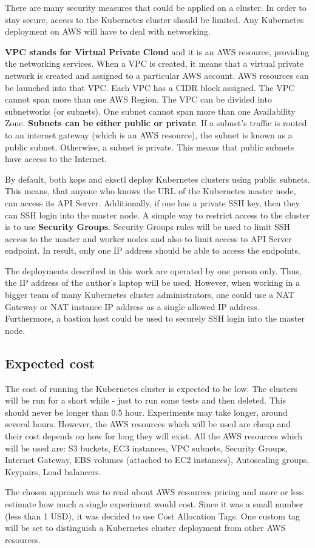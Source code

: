 There are many security measures that could be applied on a cluster. In order to stay secure, access to the Kubernetes cluster should be limited. Any Kubernetes deployment on AWS will have to deal with networking.

\textbf{VPC stands for Virtual Private Cloud} and it is an AWS resource, providing the networking services. When a VPC is created, it means that a virtual private network is created and assigned to a particular AWS account. AWS resources can be launched into that VPC. Each VPC has a CIDR block assigned. The VPC cannot span more than one AWS Region. The VPC can be divided into subnetworks (or subnets). One subnet cannot span more than one Availability Zone. \textbf{Subnets can be either public or private}. If a subnet's traffic is routed to an internet gateway (which is an AWS resource), the subnet is known as a public subnet. Otherwise, a subnet is private\cite{aws-vpc}. This means that public subnets have access to the Internet.

By default, both kops and eksctl deploy Kubernetes clusters using public subnets. This means, that anyone who knows the URL of the Kubernetes master node, can access its API Server. Additionally, if one has a private SSH key, then they can SSH login into the master node. A simple way to restrict access to the cluster is to use \textbf{Security Groups}. Security Groups rules will be used to limit SSH access to the master and worker nodes and also to limit access to API Server endpoint\cite{online-kops-cs}. In result, only one IP address should be able to access the endpoints.

The deployments described in this work are operated by one person only. Thus, the IP address of the author's laptop will be used. However, when working in a bigger team of many Kubernetes cluster administrators, one could use a NAT Gateway or NAT instance IP address as a single allowed IP address. Furthermore, a bastion host could be used to securely SSH login into the master node\cite{aws-bastion}.

\subsection{Expected cost}

The cost of running the Kubernetes cluster is expected to be low. The clusters will be run for a short while - just to run some tests and then deleted. This should never be longer than 0.5 hour. Experiments may take longer, around several hours. However, the AWS resources which will be used are cheap and their cost depends on how for long they will exist. All the AWS resources which will be used are: S3 buckets, EC3 instances, VPC subnets, Security Groups, Internet Gateway, EBS volumes (attached to EC2 instances), Autoscaling groups, Keypairs, Load balancers.

The chosen approach was to read about AWS resources pricing and more or less estimate how much a single experiment would cost. Since it was a small number (less than 1 USD), it was decided to use Cost Allocation Tags\cite{amazon-cost-tags}. One custom tag will be set to distinguish a Kubernetes cluster deployment from other AWS resources.

